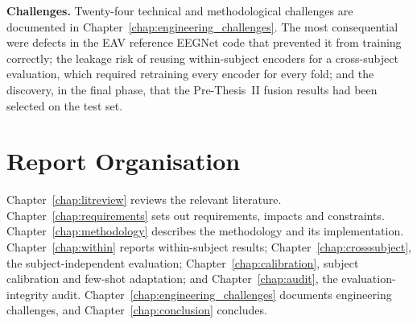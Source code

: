 \textbf{Challenges.} Twenty-four technical and methodological challenges are documented in Chapter~\ref{chap:engineering_challenges}. The most consequential were defects in the EAV reference EEGNet code that prevented it from training correctly; the leakage risk of reusing within-subject encoders for a cross-subject evaluation, which required retraining every encoder for every fold; and the discovery, in the final phase, that the Pre-Thesis~II fusion results had been selected on the test set.

\section{Report Organisation}
Chapter~\ref{chap:litreview} reviews the relevant literature. Chapter~\ref{chap:requirements} sets out requirements, impacts and constraints. Chapter~\ref{chap:methodology} describes the methodology and its implementation. Chapter~\ref{chap:within} reports within-subject results; Chapter~\ref{chap:crosssubject}, the subject-independent evaluation; Chapter~\ref{chap:calibration}, subject calibration and few-shot adaptation; and Chapter~\ref{chap:audit}, the evaluation-integrity audit. Chapter~\ref{chap:engineering_challenges} documents engineering challenges, and Chapter~\ref{chap:conclusion} concludes.

